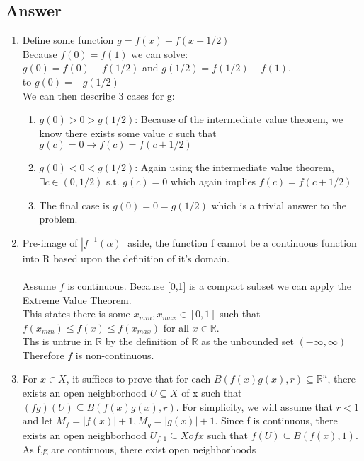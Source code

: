 \documentclass{article}
\begin{document}
\subsection*{Answer}
\begin{enumerate}[label=(\alph*)]
	\item
		Define some function \(g = f(x) -f(x + 1/2)\) \\
		Because \(f(0) = f(1)\) we can solve:\\
		 \(g(0) = f(0) - f(1/2)\) and \(g(1/2) = f(1/2) - f(1)\). \\
		to \(g(0) = -g(1/2)\) \\
		We can then describe 3 cases for g: \\
		\begin{enumerate}
		\item
			\(g(0) > 0 > g(1/2)\): Because of the intermediate value theorem, we know there exists some value \(c\) such
			that \(g(c) = 0 \to f(c) = f(c + 1/2)\)
		\item 
			\(g(0) < 0 < g(1/2)\): Again using the intermediate value theorem, \(\exists c \in (0,1/2)\) s.t. \(g(c) = 0\) 
			which again implies \(f(c) = f(c + 1/2)\)
		\item 
			The final case is \(g(0) = 0 = g(1/2)\) which is a trivial answer to the problem.
		\end{enumerate}
	\item
		Pre-image of \(|f^{-1}(\alpha)|\) aside, the function f cannot be a continuous function into R based upon the definition
		of it's domain. \\\\
		Assume \(f\) is continuous. Because [0,1] is a compact subset we can apply the Extreme Value Theorem. \\
		This states there is some \(x_{min},x_{max} \in [0,1]\) such that \(f(x_{min}) \le f(x) \le f(x_{max})\) for all 
		\(x\in \mathbb{R}\). \\
		Ths is untrue in \(\mathbb{R}\) by the definition of \(\mathbb{R}\) as the unbounded set \((-\infty,\infty)\) \\
		Therefore \(f\) is non-continuous.
	\item
		For \(x\in  X\), it suffices to prove that for each \(B(f(x)g(x),r) \subseteq \mathbb{R}^{n}\), there exists an open
		neighborhood \(U \subseteq X\) of x such that \((f g)(U) \subseteq B(f(x)g(x),r)\). For simplicity, we will assume
		that \(r < 1\) and let \(M_{f} = | f(x)| + 1, M_{g} = |g(x)| + 1\). Since f is continuous, there exists an open neighborhood 
		\(U_{f,1} \subseteq X of x\) such that \(f(U) \subseteq B(f(x),1)\). As f,g are continuous, there exist open neighborhoods 

\end{enumerate}
\end{document}
